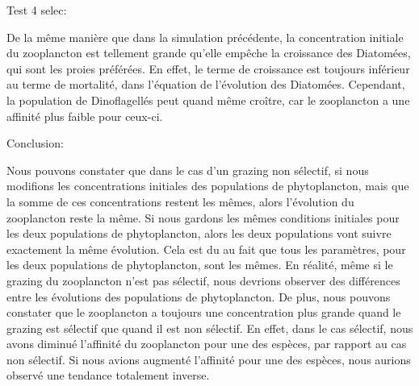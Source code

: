 Test 4 selec:

De la même manière que dans la simulation précédente, la concentration initiale du zooplancton est tellement grande qu'elle empêche la croissance des Diatomées, qui sont les proies préférées. En effet, le terme de croissance est toujours inférieur au terme de mortalité, dans l'équation de l'évolution des Diatomées. Cependant, la population de Dinoflagellés peut quand même croître, car le zooplancton a une affinité plus faible pour ceux-ci.

Conclusion:

Nous pouvons constater que dans le cas d'un grazing non sélectif, si nous modifions les concentrations initiales des populations de phytoplancton, mais que la somme de ces concentrations restent les mêmes, alors l'évolution du zooplancton reste la même. Si nous gardons les mêmes conditions initiales pour les deux populations de phytoplancton, alors les deux populations vont suivre exactement la même évolution. Cela est du au fait que tous les paramètres, pour les deux populations de phytoplancton, sont les mêmes. En réalité, même si le grazing du zooplancton n'est pas sélectif, nous devrions observer des différences entre les évolutions des populations de phytoplancton.
De plus, nous pouvons constater que le zooplancton a toujours une concentration plus grande quand le grazing est sélectif que quand il est non sélectif. En effet, dans le cas sélectif, nous avons diminué l'affinité du zooplancton pour une des espèces, par rapport au cas non sélectif. Si nous avions augmenté l'affinité pour une des espèces, nous aurions observé une tendance totalement inverse.
